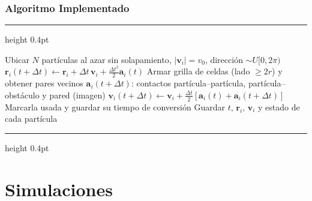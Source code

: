 \documentclass[11pt,aspectratio=169]{beamer}
\newcommand{\vect}[1]{\mathbf{#1}}          %
\newcommand{\dt}{\Delta t}
\begin{document}
\begin{frame}
  \frametitle{Algoritmo Implementado}

  \vfill
  \begin{center}
  \begin{minipage}{0.80\textwidth}
    \hrule height 0.4pt
    \vspace{3pt}
    {\scriptsize
    \begin{algorithmic}[1]
      \State Ubicar $N$ partículas al azar sin solapamiento, $|\vect{v}_i|=v_0$, dirección $\sim U[0,2\pi)$
      \For{$n=1,\dots,t_f/\dt$}
        \State $\vect{r}_i(t+\dt)\gets\vect{r}_i+\dt\,\vect{v}_i+\tfrac{\dt^2}{2}\vect{a}_i(t)$
        \State Armar grilla de celdas (lado $\ge 2r$) y obtener pares vecinos
        \State $\vect{a}_i(t+\dt)$: contactos partícula--partícula, partícula--obstáculo y pared (imagen)
        \State $\vect{v}_i(t+\dt)\gets\vect{v}_i+\tfrac{\dt}{2}\left[\vect{a}_i(t)+\vect{a}_i(t+\dt)\right]$
          \State Marcarla usada y guardar su tiempo de conversión
        \EndIf
         \Comment{$\dt_2=k\,\dt$}
          \State Guardar $t$, $\vect{r}_i$, $\vect{v}_i$ y estado de cada partícula
        \EndIf
      \EndFor
    \end{algorithmic}}
    \vspace{3pt}
    \hrule height 0.4pt
  \end{minipage}
  \end{center}
  \vfill
\end{frame}

\section{Simulaciones}
\end{document}
